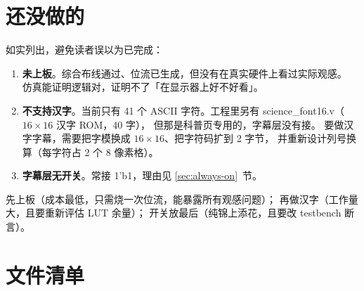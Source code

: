 \documentclass[10pt,a4paper]{article}
\newcommand{\sig}[1]{{\ttfamily\small #1}}
\newcommand{\code}[1]{{\ttfamily\small #1}}
\begin{document}
\section{还没做的}
\label{sec:todo}

如实列出，避免读者误以为已完成：

\begin{enumerate}
\item \textbf{未上板}。综合布线通过、位流已生成，但没有在真实硬件上看过实际观感。
      仿真能证明逻辑对，证明不了「在显示器上好不好看」。
\item \textbf{不支持汉字}。当前只有 41 个 ASCII 字符。工程里另有
      \sig{science\_font16.v}（$16\times16$ 汉字 ROM，40 字），
      但那是科普页专用的，字幕层没有接。
      要做汉字字幕，需要把字模换成 $16\times16$、把字符码扩到 2 字节，
      并重新设计列号换算（每字符占 2 个 8 像素格）。
\item \textbf{字幕层无开关}。常接 \code{1'b1}，理由见 \ref{sec:always-on}~节。
\end{enumerate}

\begin{dsnote}
先上板（成本最低，只需烧一次位流，能暴露所有观感问题）；
再做汉字（工作量大，且要重新评估 LUT 余量）；
开关放最后（纯锦上添花，且要改 testbench 断言）。
\end{dsnote}

\appendix
\section{文件清单}
\end{document}
